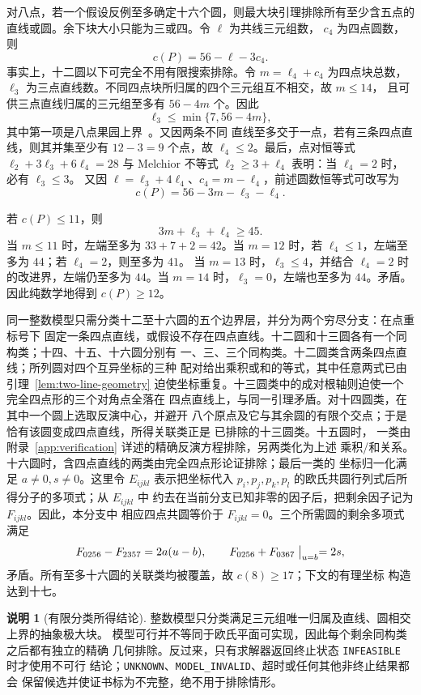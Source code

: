 \documentclass[11pt,a4paper]{ctexart}
\theoremstyle{definition}
\newtheorem{remark}[theorem]{说明}
\begin{document}
对八点，若一个假设反例至多确定十六个圆，则最大块引理排除所有至少含五点的
直线或圆。余下块大小只能为三或四。令 $\ell$ 为共线三元组数，
$c_4$ 为四点圆数，则
\[
c(P)=56-\ell-3c_4.
\]
事实上，十二圆以下可完全不用有限搜索排除。令 $m=\ell_4+c_4$ 为四点块总数，
$\ell_3$ 为三点直线数。不同四点块所归属的四个三元组互不相交，故 $m\le14$，
且可供三点直线归属的三元组至多有 $56-4m$ 个。因此
\[
 \ell_3\le\min\{7,56-4m\},
\]
其中第一项是八点果园上界~\cite[Table~I]{burr-grunbaum-sloane}。又因两条不同
直线至多交于一点，若有三条四点直线，则其并集至少有 $12-3=9$ 个点，故
$\ell_4\le2$。最后，点对恒等式
$\ell_2+3\ell_3+6\ell_4=28$ 与 Melchior 不等式
$\ell_2\ge3+\ell_4$ 表明：当 $\ell_4=2$ 时，必有 $\ell_3\le3$。
又因 $\ell=\ell_3+4\ell_4$、$c_4=m-\ell_4$，前述圆数恒等式可改写为
\[
 c(P)=56-3m-\ell_3-\ell_4.
\]

若 $c(P)\le11$，则
\[
 3m+\ell_3+\ell_4\ge45.
\]
当 $m\le11$ 时，左端至多为 $33+7+2=42$。当 $m=12$ 时，若
$\ell_4\le1$，左端至多为 $44$；若 $\ell_4=2$，则至多为 $41$。
当 $m=13$ 时，$\ell_3\le4$，并结合 $\ell_4=2$ 时的改进界，左端仍至多为
$44$。当 $m=14$ 时，$\ell_3=0$，左端也至多为 $44$。矛盾。因此纯数学地得到
$c(P)\ge12$。

同一整数模型只需分类十二至十六圆的五个边界层，并分为两个穷尽分支：在点重标号下
固定一条四点直线，或假设不存在四点直线。十二圆和十三圆各有一个同构类；十四、十五、十六圆分别有
一、三、三个同构类。十二圆类含两条四点直线；所列圆对四个互异坐标的三种
配对给出乘积或和的等式，其中任意两式已由引理~\ref{lem:two-line-geometry}
迫使坐标重复。十三圆类中的成对根轴则迫使一个完全四点形的三个对角点全落在
四点直线上，与同一引理矛盾。对十四圆类，在其中一个圆上选取反演中心，并避开
八个原点及它与其余圆的有限个交点；于是恰有该圆变成四点直线，所得关联类正是
已排除的十三圆类。十五圆时，
一类由附录~\ref{app:verification} 详述的精确反演方程排除，另两类化为上述
乘积/和关系。十六圆时，含四点直线的两类由完全四点形论证排除；最后一类的
坐标归一化满足 $a\ne0,s\ne0$。这里令 $E_{ijkl}$ 表示把坐标代入
$p_i,p_j,p_k,p_l$ 的欧氏共圆行列式后所得分子的多项式；从 $E_{ijkl}$ 中
约去在当前分支已知非零的因子后，把剩余因子记为 $F_{ijkl}$。因此，本分支中
相应四点共圆等价于 $F_{ijkl}=0$。三个所需圆的剩余多项式满足
\[
F_{0256}-F_{2357}=2a(u-b),\qquad
F_{0256}+F_{0367}\bigm|_{u=b}=2s,
\]
矛盾。所有至多十六圆的关联类均被覆盖，故 $c(8)\ge17$；下文的有理坐标
构造达到十七。

\begin{remark}[有限分类所得结论]
整数模型只分类满足三元组唯一归属及直线、圆相交上界的抽象极大块。
模型可行并不等同于欧氏平面可实现，因此每个剩余同构类之后都有独立的精确
几何排除。反过来，只有求解器返回终止状态 \texttt{INFEASIBLE} 时才使用不可行
结论；\texttt{UNKNOWN}、\texttt{MODEL\_INVALID}、超时或任何其他非终止结果都会
保留候选并使证书标为不完整，绝不用于排除情形。
\end{remark}
\end{document}
